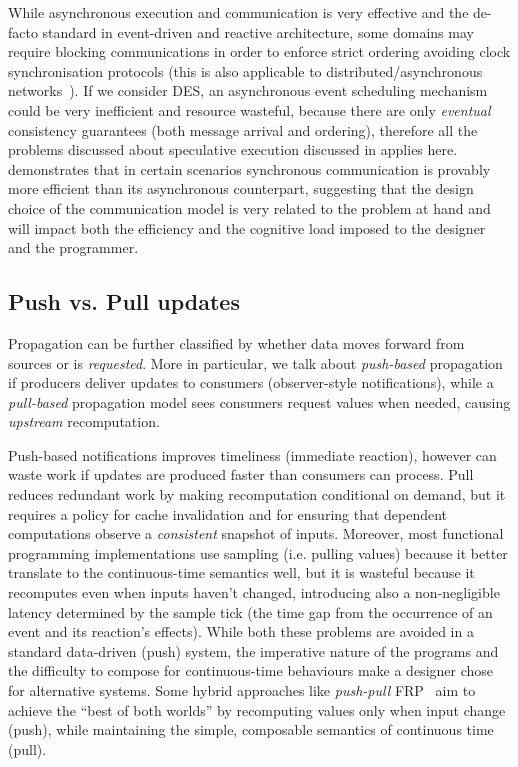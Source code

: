 While asynchronous execution and communication is very effective and the
de-facto standard in event-driven and reactive architecture, some domains may
require blocking communications in order to enforce strict ordering avoiding
clock synchronisation protocols (this is also applicable to
distributed/asynchronous networks~\cite{awerbuch1985CNS}). If we consider
\ac{DES}, an asynchronous event scheduling mechanism could be very inefficient
and resource wasteful, because there are only \emph{eventual} consistency
guarantees (both message arrival and ordering), therefore all the problems
discussed about speculative execution discussed in 
applies here. \cite{arjomandi1983ESVADS} demonstrates that in certain scenarios
synchronous communication is provably more efficient than its asynchronous
counterpart, suggesting that the design choice of the communication model is
very related to the problem at hand and will impact both the efficiency and the
cognitive load imposed to the designer and the programmer.

\subsection{Push vs. Pull updates}\label{ssec:push_pull}
Propagation can be further classified by whether data moves forward from
sources or is \emph{requested}. More in particular, we talk about
\emph{push-based} propagation if producers deliver updates to consumers
(observer-style notifications), while a \emph{pull-based} propagation model
sees consumers request values when needed, causing \emph{upstream}
recomputation.

Push-based notifications improves timeliness (immediate reaction), however can
waste work if updates are produced faster than consumers can process. Pull
reduces redundant work by making recomputation conditional on demand, but it
requires a policy for cache invalidation and for ensuring that dependent
computations observe a \emph{consistent} snapshot of inputs. Moreover, most
functional programming implementations use sampling (i.e. pulling values)
because it better translate to the continuous-time semantics well, but it is
wasteful because it recomputes even when inputs haven't changed, introducing
also a non-negligible latency determined by the sample tick (the time gap from
the occurrence of an event and its reaction's effects). While both these
problems are avoided in a standard data-driven (push) system, the imperative
nature of the programs and the difficulty to compose for continuous-time
behaviours make a designer chose for alternative systems. Some hybrid
approaches like \emph{push-pull} \ac{FRP}~\cite{elliott2009PPFRP} aim to
achieve the ``best of both worlds'' by recomputing values only when input
change (push), while maintaining the simple, composable semantics of continuous
time (pull).

